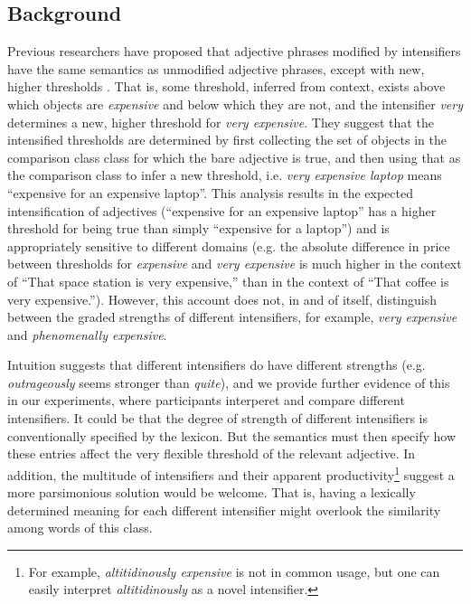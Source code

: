 \documentclass[10pt,letterpaper]{article}
\newcommand{\w}[1]{\emph{#1}}
\begin{document}
\subsection{Background}
Previous researchers have proposed that adjective phrases modified by intensifiers have the same semantics as unmodified adjective phrases, except with new, higher thresholds \cite{kennedyMcnally, klein, wheeler}. That is, some threshold, inferred from context, exists above which objects are \w{expensive} and below which they are not, and the intensifier \w{very} determines a new, higher threshold for \w{very expensive}.
They suggest that the intensified thresholds are determined by first collecting the set of objects in the comparison class class for which the bare adjective is true, and then using that as the comparison class to infer a new threshold, i.e. \w{very expensive laptop} means ``expensive for an expensive laptop''. This analysis results in the expected intensification of adjectives (``expensive for an expensive laptop'' has a higher threshold for being true than simply ``expensive for a laptop'') and is appropriately sensitive to different domains (e.g. the absolute difference in price between thresholds for \w{expensive} and \w{very expensive} is much higher in the context of ``That space station is very expensive,'' than in the context of ``That coffee is very expensive.'').
However, this account does not, in and of itself, distinguish between the graded strengths of different intensifiers, for example, \w{very expensive} and \w{phenomenally expensive}.

Intuition suggests that different intensifiers do have different strengths (e.g. \w{outrageously} seems stronger than \w{quite}), and we provide further evidence of this in our experiments, where participants interperet and compare different intensifiers.
It could be that the degree of strength of different intensifiers is conventionally specified by the lexicon. But the semantics must then specify how these entries affect the very flexible threshold of the relevant adjective.
In addition, the multitude of intensifiers \cite{bolinger} and their apparent productivity\footnote{For example, \w{altitidinously expensive} is not in common usage, but one can easily interpret \w{altitidinously} as a novel intensifier.} suggest a more parsimonious solution would be welcome. 
That is, having a lexically determined meaning for each different intensifier might overlook the similarity among words of this class.
\end{document}
